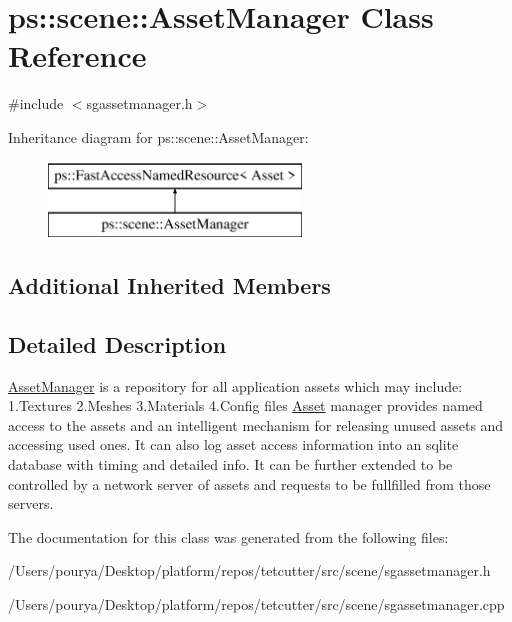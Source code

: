 \hypertarget{classps_1_1scene_1_1AssetManager}{}\section{ps\+:\+:scene\+:\+:Asset\+Manager Class Reference}
\label{classps_1_1scene_1_1AssetManager}


{\ttfamily \#include $<$sgassetmanager.\+h$>$}

Inheritance diagram for ps\+:\+:scene\+:\+:Asset\+Manager\+:\begin{figure}[H]
\begin{center}
\leavevmode
\includegraphics[height=2.000000cm]{classps_1_1scene_1_1AssetManager}
\end{center}
\end{figure}
\subsection*{Additional Inherited Members}


\subsection{Detailed Description}
\hyperlink{classps_1_1scene_1_1AssetManager}{Asset\+Manager} is a repository for all application assets which may include\+: 1.\+Textures 2.\+Meshes 3.\+Materials 4.\+Config files \hyperlink{classps_1_1scene_1_1Asset}{Asset} manager provides named access to the assets and an intelligent mechanism for releasing unused assets and accessing used ones. It can also log asset access information into an sqlite database with timing and detailed info. It can be further extended to be controlled by a network server of assets and requests to be fullfilled from those servers. 

The documentation for this class was generated from the following files\+:\begin{DoxyCompactItemize}
\item 
/\+Users/pourya/\+Desktop/platform/repos/tetcutter/src/scene/sgassetmanager.\+h\item 
/\+Users/pourya/\+Desktop/platform/repos/tetcutter/src/scene/sgassetmanager.\+cpp\end{DoxyCompactItemize}
